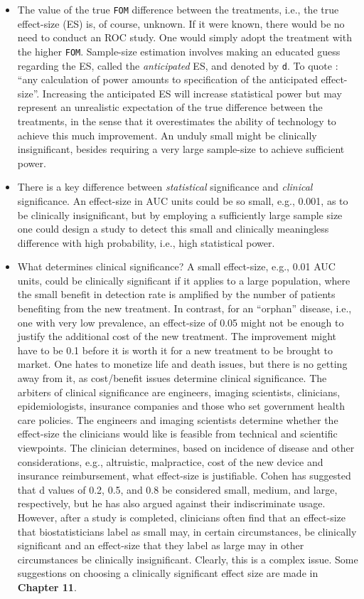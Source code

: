 \documentclass[
]{book}
\begin{document}
\begin{itemize}
\item
  The value of the true \texttt{FOM} difference between the treatments, i.e., the true effect-size (ES) is, of course, unknown. If it were known, there would be no need to conduct an ROC study. One would simply adopt the treatment with the higher \texttt{FOM}. Sample-size estimation involves making an educated guess regarding the ES, called the \emph{anticipated} ES, and denoted by \texttt{d}. To quote \citep{RN1983}: ``any calculation of power amounts to specification of the anticipated effect-size''. Increasing the anticipated ES will increase statistical power but may represent an unrealistic expectation of the true difference between the treatments, in the sense that it overestimates the ability of technology to achieve this much improvement. An unduly small might be clinically insignificant, besides requiring a very large sample-size to achieve sufficient power.
\item
  There is a key difference between \emph{statistical} significance and \emph{clinical} significance. An effect-size in AUC units could be so small, e.g., 0.001, as to be clinically insignificant, but by employing a sufficiently large sample size one could design a study to detect this small and clinically meaningless difference with high probability, i.e., high statistical power.
\item
  What determines clinical significance? A small effect-size, e.g., 0.01 AUC units, could be clinically significant if it applies to a large population, where the small benefit in detection rate is amplified by the number of patients benefiting from the new treatment. In contrast, for an ``orphan'' disease, i.e., one with very low prevalence, an effect-size of 0.05 might not be enough to justify the additional cost of the new treatment. The improvement might have to be 0.1 before it is worth it for a new treatment to be brought to market. One hates to monetize life and death issues, but there is no getting away from it, as cost/benefit issues determine clinical significance. The arbiters of clinical significance are engineers, imaging scientists, clinicians, epidemiologists, insurance companies and those who set government health care policies. The engineers and imaging scientists determine whether the effect-size the clinicians would like is feasible from technical and scientific viewpoints. The clinician determines, based on incidence of disease and other considerations, e.g., altruistic, malpractice, cost of the new device and insurance reimbursement, what effect-size is justifiable. Cohen has suggested that d values of 0.2, 0.5, and 0.8 be considered small, medium, and large, respectively, but he has also argued against their indiscriminate usage. However, after a study is completed, clinicians often find that an effect-size that biostatisticians label as small may, in certain circumstances, be clinically significant and an effect-size that they label as large may in other circumstances be clinically insignificant. Clearly, this is a complex issue. Some suggestions on choosing a clinically significant effect size are made in \textbf{Chapter 11}.

\end{itemize}
\end{document}
